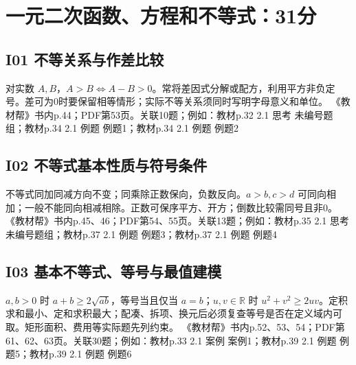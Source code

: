 \section{一元二次函数、方程和不等式：31分}
\par\medskip\noindent\begin{minipage}{\linewidth}\subsection{I01 不等关系与作差比较}
对实数 $A,B$，$A>B\Leftrightarrow A-B>0$。常将差因式分解或配方，利用平方非负定号。差可为0时要保留相等情形；实际不等关系须同时写明字母意义和单位。
{\small 《教材帮》书内p.44；PDF第53页。关联10题；例如：教材p.32 2.1 思考 未编号题组；教材p.34 2.1 例题 例题1；教材p.34 2.1 例题 例题2}\par\end{minipage}\par
\par\medskip\noindent\begin{minipage}{\linewidth}\subsection{I02 不等式基本性质与符号条件}
不等式同加同减方向不变；同乘除正数保向，负数反向。$a>b,c>d$ 可同向相加；一般不能同向相减相除。正数可保序平方、开方；倒数比较需同号且非0。
{\small 《教材帮》书内p.45、46；PDF第54、55页。关联13题；例如：教材p.35 2.1 思考 未编号题组；教材p.37 2.1 例题 例题3；教材p.37 2.1 例题 例题4}\par\end{minipage}\par
\par\medskip\noindent\begin{minipage}{\linewidth}\subsection{I03 基本不等式、等号与最值建模}
$a,b>0$ 时 $a+b\ge2\sqrt{ab}$，等号当且仅当 $a=b$；$u,v\in\mathbb R$ 时 $u^2+v^2\ge2uv$。定积求和最小、定和求积最大；配凑、拆项、换元后必须复查等号是否在定义域内可取。矩形面积、费用等实际题先列约束。
{\small 《教材帮》书内p.52、53、54；PDF第61、62、63页。关联30题；例如：教材p.33 2.1 案例 案例1；教材p.39 2.1 例题 例题5；教材p.39 2.1 例题 例题6}\par\end{minipage}\par
